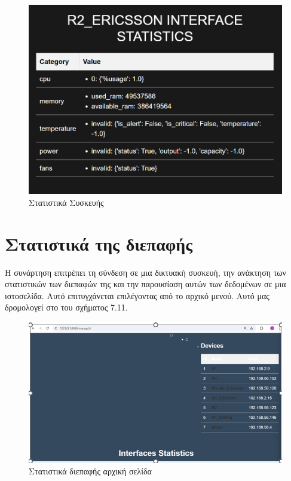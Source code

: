 \begin{figure}[h]
	\centering
	\includegraphics[width=1.0\textwidth]{graphics/device_statistics_response.png}
	\caption{Στατιστικά Συσκευής}
\end{figure}

\FloatBarrier


\section{Στατιστικά της διεπαφής}

Η συνάρτηση επιτρέπει τη σύνδεση σε μια δικτυακή συσκευή, την ανάκτηση των στατιστικών των διεπαφών της και την παρουσίαση αυτών των δεδομένων σε μια ιστοσελίδα. Αυτό επιτυγχάνεται επιλέγοντας  από το αρχικό μενού. Αυτό μας δρομολογεί στο  του σχήματος 7.11.

\FloatBarrier

\begin{figure}[h]
	\centering
	\includegraphics[width=1.0\textwidth]{graphics/manage3.png}
	\caption{Στατιστικά διεπαφής αρχική σελίδα}
\end{figure}

